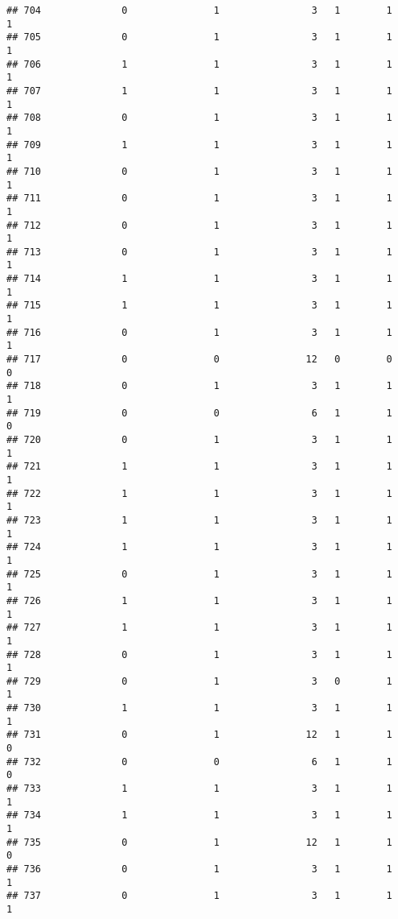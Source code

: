 \documentclass[]{article}
\begin{document}
\begin{verbatim}
## 704              0               1                3   1        1        1
## 705              0               1                3   1        1        1
## 706              1               1                3   1        1        1
## 707              1               1                3   1        1        1
## 708              0               1                3   1        1        1
## 709              1               1                3   1        1        1
## 710              0               1                3   1        1        1
## 711              0               1                3   1        1        1
## 712              0               1                3   1        1        1
## 713              0               1                3   1        1        1
## 714              1               1                3   1        1        1
## 715              1               1                3   1        1        1
## 716              0               1                3   1        1        1
## 717              0               0               12   0        0        0
## 718              0               1                3   1        1        1
## 719              0               0                6   1        1        0
## 720              0               1                3   1        1        1
## 721              1               1                3   1        1        1
## 722              1               1                3   1        1        1
## 723              1               1                3   1        1        1
## 724              1               1                3   1        1        1
## 725              0               1                3   1        1        1
## 726              1               1                3   1        1        1
## 727              1               1                3   1        1        1
## 728              0               1                3   1        1        1
## 729              0               1                3   0        1        1
## 730              1               1                3   1        1        1
## 731              0               1               12   1        1        0
## 732              0               0                6   1        1        0
## 733              1               1                3   1        1        1
## 734              1               1                3   1        1        1
## 735              0               1               12   1        1        0
## 736              0               1                3   1        1        1
## 737              0               1                3   1        1        1

\end{verbatim}
\end{document}
